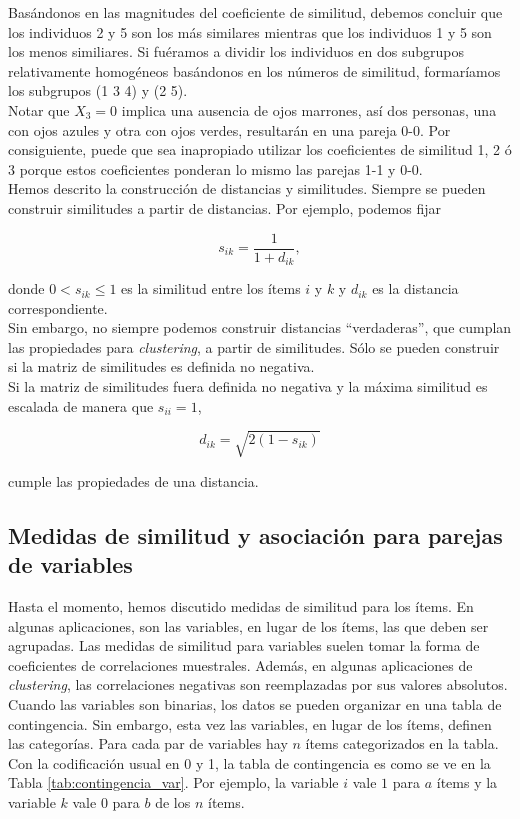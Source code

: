 \documentclass[a4paper, 20pt]{article}
\begin{document}
Basándonos en las magnitudes del coeficiente de similitud, debemos concluir que los individuos 2 y 5 son los más similares mientras que los individuos 1 y 5 son los menos similiares. Si fuéramos a dividir los individuos en dos subgrupos relativamente homogéneos basándonos en los números de similitud, formaríamos los subgrupos (1 3 4) y (2 5).\\
Notar que $X_3=0$ implica una ausencia de ojos marrones, así dos personas, una con ojos azules y otra con ojos verdes, resultarán en una pareja 0-0. Por consiguiente, puede que sea inapropiado utilizar los coeficientes de similitud 1, 2 ó 3 porque estos coeficientes ponderan lo mismo las parejas 1-1 y 0-0.\\

Hemos descrito la construcción de distancias y similitudes. Siempre se pueden construir similitudes a partir de distancias. Por ejemplo, podemos fijar

$$ s_{ik} = \frac{1}{1+d_{ik}},$$ 

donde $0<s_{ik}\leq 1$ es la similitud entre los ítems $i$ y $k$ y $d_{ik}$ es la distancia correspondiente.\\
Sin embargo, no siempre podemos construir distancias ``verdaderas'', que cumplan las propiedades para \textit{clustering}, a partir de similitudes. Sólo se pueden construir si la matriz de similitudes es definida no negativa.\\
Si la matriz de similitudes fuera definida no negativa y la máxima similitud es escalada de manera que $s_{ii}=1$,

$$ d_{ik}=\sqrt{2(1-s_{ik})}$$

cumple las propiedades de una distancia.

\subsection{Medidas de similitud y asociación para parejas de variables}

Hasta el momento, hemos discutido medidas de similitud para los ítems. En algunas aplicaciones, son las variables, en lugar de los ítems, las que deben ser agrupadas. Las medidas de similitud para variables suelen tomar la forma de coeficientes de correlaciones muestrales. Además, en algunas aplicaciones de \textit{clustering}, las correlaciones negativas son reemplazadas por sus valores absolutos.\\
Cuando las variables son binarias, los datos se pueden organizar en una tabla de contingencia. Sin embargo, esta vez las variables, en lugar de los ítems, definen las categorías. Para cada par de variables hay $n$ ítems categorizados en la tabla. Con la codificación usual en 0 y 1, la tabla de contingencia es como se ve en la Tabla \ref{tab:contingencia_var}. Por ejemplo, la variable $i$ vale $1$ para $a$ ítems y la variable $k$ vale $0$ para $b$ de los $n$ ítems.\\
\end{document}
